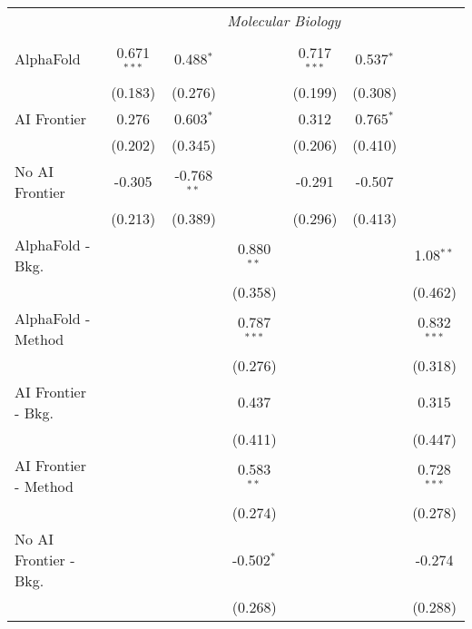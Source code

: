 \begin{tabular}{lcccccc}
 & \multicolumn{6}{c}{\textit{Molecular Biology}} \\ \\
   AlphaFold               & 0.671$^{***}$ & 0.488$^{*}$   &               & 0.717$^{***}$ & 0.537$^{*}$ &   \\   
                           & (0.183)       & (0.276)       &               & (0.199)       & (0.308)     &   \\   
   AI Frontier             & 0.276         & 0.603$^{*}$   &               & 0.312         & 0.765$^{*}$ &   \\   
                           & (0.202)       & (0.345)       &               & (0.206)       & (0.410)     &   \\   
   No AI Frontier          & -0.305        & -0.768$^{**}$ &               & -0.291        & -0.507      &   \\   
                           & (0.213)       & (0.389)       &               & (0.296)       & (0.413)     &   \\   
   AlphaFold - Bkg.        &               &               & 0.880$^{**}$  &               &             & 1.08$^{**}$\\   
                           &               &               & (0.358)       &               &             & (0.462)\\   
   AlphaFold - Method      &               &               & 0.787$^{***}$ &               &             & 0.832$^{***}$\\   
                           &               &               & (0.276)       &               &             & (0.318)\\   
   AI Frontier - Bkg.      &               &               & 0.437         &               &             & 0.315\\   
                           &               &               & (0.411)       &               &             & (0.447)\\   
   AI Frontier - Method    &               &               & 0.583$^{**}$  &               &             & 0.728$^{***}$\\   
                           &               &               & (0.274)       &               &             & (0.278)\\   
   No AI Frontier - Bkg.   &               &               & -0.502$^{*}$  &               &             & -0.274\\   
                           &               &               & (0.268)       &               &             & (0.288)\\   

\end{tabular}
